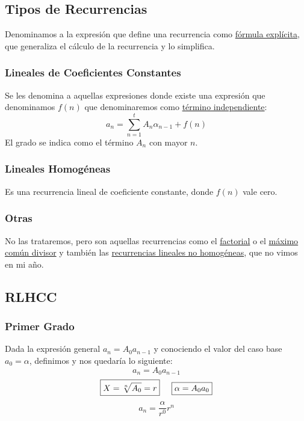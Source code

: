 \subsection{Tipos de Recurrencias}
\noindent Denominamos a la expresión que define una recurrencia como \underline{fórmula explícita}, que generaliza el cálculo de la recurrencia y lo simplifica.
\subsubsection{Lineales de Coeficientes Constantes}
\noindent Se les denomina a aquellas expresiones donde existe una expresión que denominamos \(f(n)\) que denominaremos como \underline{término independiente}:
\[
        a_n = \sum_{n=1}^tA_n \alpha_{n-1} + f(n)
\]
\noindent El grado se indica como el término \(A_n\) con mayor \(n\).

\subsubsection{Lineales Homogéneas}
\noindent Es una recurrencia lineal de coeficiente constante, donde \(f(n)\) vale cero.
\subsubsection{Otras}
\noindent No las trataremos, pero son aquellas recurrencias como el \underline{factorial} o el \underline{máximo común divisor} y también las \underline{recurrencias lineales no homogéneas}, que no vimos en mi año.
\subsection{RLHCC}
\subsubsection{Primer Grado}
\noindent Dada la expresión general \(a_n = A_0 a_{n-1}\) y conociendo el valor del caso base \(a_0 = \alpha\), definimos y nos quedaría lo siguiente:
\[
        \boxed{a_n = A_0 a_{n-1}}
\]
\[
        \boxed{X = \sqrt[n]{A_0} = r} \hspace{5mm} \boxed{\alpha = A_0 a_0}
\]
\[
        \boxed{a_n = \frac{\alpha}{r^0}r^n}
\]
